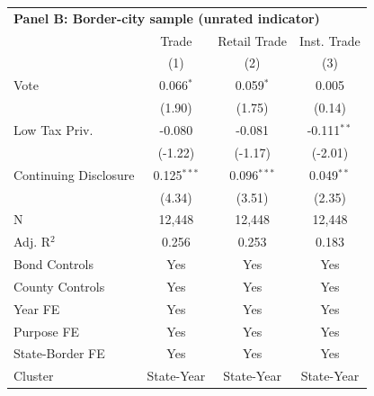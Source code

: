 \begingroup
\centering
\begin{tabular*}{\textwidth}{@{\extracolsep{\fill}}lccc}
\multicolumn{5}{l}{\textbf{Panel B: Border-city sample (unrated indicator)}}\\

\addlinespace
   \toprule
                         & Trade         & Retail Trade  & Inst. Trade\\  
                         & (1)           & (2)           & (3)\\  
   \midrule 
   Vote                  & 0.066$^{*}$   & 0.059$^{*}$   & 0.005\\   
                         & (1.90)       & (1.75)       & (0.14)\\   
   Low Tax Priv.         & -0.080        & -0.081        & -0.111$^{**}$\\   
                         & (-1.22)      & (-1.17)      & (-2.01)\\   
   Continuing Disclosure & 0.125$^{***}$ & 0.096$^{***}$ & 0.049$^{**}$\\   
                         & (4.34)       & (3.51)       & (2.35)\\   
   \hline
   N          & 12,448        & 12,448        & 12,448\\  
   Adj. R$^2$        & 0.256         & 0.253         & 0.183\\  
   Bond Controls         & Yes           & Yes           & Yes\\  
   County Controls       & Yes           & Yes           & Yes\\  
   Year FE               & Yes           & Yes           & Yes\\  
   Purpose FE            & Yes           & Yes           & Yes\\  
   State-Border FE       & Yes           & Yes           & Yes\\  
   Cluster              & State-Year & State-Year & State-Year\\  
   \bottomrule
\end{tabular*}
\par\endgroup
